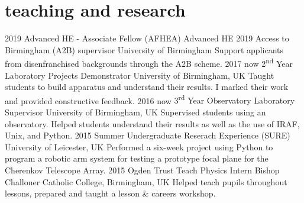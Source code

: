 \documentclass[]{k-cv} %
\begin{document}
\section{teaching and research}
\begin{entrylist}
\centry
{2019}
{Advanced HE - Associate Fellow (AFHEA)}
{Advanced HE}
{}
\centry
{2019}
{Access to Birmingham (A2B) supervisor}
{University of Birmingham}
{Support applicants from disenfranchised backgrounds through the A2B scheme.}
\centry
{2017 \to now}
{2\textsuperscript{nd} Year Laboratory Projects Demonstrator}
{University of Birmingham, UK}
{Taught students to build apparatus and understand their results. I marked their work and provided constructive feedback.}
\centry
{2016 \to now}
{3\textsuperscript{rd} Year Observatory Laboratory Supervisor}
{University of Birmingham, UK}
{Supervised students using an observatory. Helped students understand their results as well as the use of IRAF, Unix, and Python.}
\centry
{2015}
{Summer Undergraduate Reserach Experience (SURE)}
{University of Leicester, UK}
{Performed a six-week project using Python to program a robotic arm system for testing a prototype focal plane for the Cherenkov Telescope Array.}
\centry
{2015}
{Ogden Trust Teach Physics Intern}
{Bishop Challoner Catholic College, Birmingham, UK}
{Helped teach pupils throughout lessons, prepared and taught a lesson \& careers workshop.}
\end{entrylist}
\end{document}

